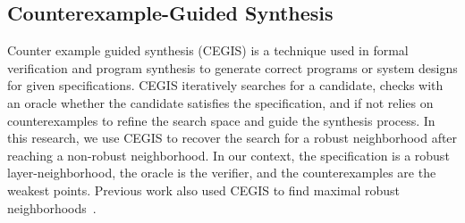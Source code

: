 \subsection{Counterexample-Guided Synthesis}
Counter example guided synthesis (CEGIS) is a technique used in formal verification and program synthesis to generate correct programs or system designs for given specifications.
CEGIS iteratively searches for a candidate, checks with an oracle whether the candidate satisfies the specification, and if not relies on counterexamples to refine the search space and guide the synthesis process.
In this research, we use CEGIS to recover the search for a robust neighborhood after reaching a non-robust neighborhood. %
In our context, the specification is a robust layer-neighborhood, the oracle is the verifier, and the counterexamples are the weakest points.
Previous work also used CEGIS to find maximal robust neighborhoods~\cite{CEGIS1, MARVEL, CEGIS2, CEGIS3}. %